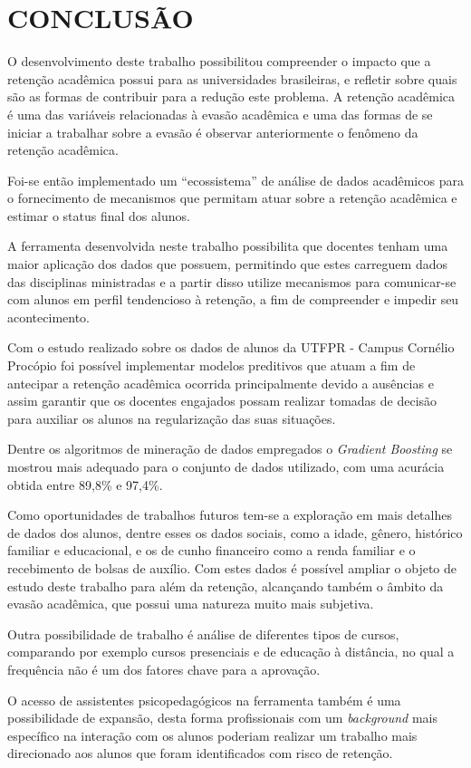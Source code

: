 \chapter{CONCLUSÃO}
\label{chap:conclusao}

O desenvolvimento deste trabalho possibilitou compreender o impacto que a retenção acadêmica possui para as universidades brasileiras, e refletir sobre quais são as formas de contribuir para a redução este problema. 
A retenção acadêmica é uma das variáveis relacionadas à evasão acadêmica e uma das formas de se iniciar a trabalhar sobre a evasão é observar anteriormente o fenômeno da retenção acadêmica.

Foi-se então implementado um ``ecossistema'' de análise de dados acadêmicos para o fornecimento de mecanismos que permitam atuar sobre a retenção acadêmica e estimar o status final dos alunos.

A ferramenta desenvolvida neste trabalho possibilita que docentes tenham uma maior aplicação dos dados que possuem, permitindo que estes carreguem dados das disciplinas ministradas e a partir disso utilize mecanismos para comunicar-se com alunos em perfil tendencioso à retenção, a fim de compreender e impedir seu acontecimento.

Com o estudo realizado sobre os dados de alunos da UTFPR - Campus Cornélio Procópio foi possível implementar modelos preditivos que atuam a fim de antecipar a retenção acadêmica ocorrida principalmente devido a ausências e assim garantir que os docentes engajados possam realizar tomadas de decisão para auxiliar os alunos na regularização das suas situações. 

Dentre os algoritmos de mineração de dados empregados o \textit{Gradient Boosting} se mostrou mais adequado para o conjunto de dados utilizado, com uma acurácia obtida entre 89,8\% e 97,4\%.

Como oportunidades de trabalhos futuros tem-se a exploração em mais detalhes de dados dos alunos, dentre esses os dados sociais, como a idade, gênero, histórico familiar e educacional, e os de cunho financeiro como a renda familiar e o recebimento de bolsas de auxílio.
Com estes dados é possível ampliar o objeto de estudo deste trabalho para além da retenção, alcançando também o âmbito da evasão acadêmica, que possui uma natureza muito mais subjetiva.

Outra possibilidade de trabalho é análise de diferentes tipos de cursos, comparando por exemplo cursos presenciais e de educação à distância, no qual a frequência não é um dos fatores chave para a aprovação.

O acesso de assistentes psicopedagógicos na ferramenta também é uma possibilidade de expansão, desta forma profissionais com um \textit{background} mais específico na interação com os alunos poderiam realizar um trabalho mais direcionado aos alunos que foram identificados com risco de retenção.